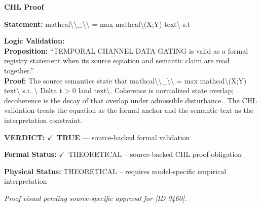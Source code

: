 \vspace{0.45em}
\noindent\textbf{CHL Proof}\par
\textbf{Statement:} mathcal\textbackslash{}\textbackslash{}\_\textbackslash{}\textbackslash{} = max mathcal\textbackslash{}(X;Y) text\textbackslash{} s.t

\textbf{Logic Validation:}\\
\textbf{Proposition:} ``TEMPORAL CHANNEL DATA GATING is valid as a formal registry statement when its source
equation and semantic claim are read together.''\\
\textbf{Proof:} The source semantics state that mathcal\textbackslash{}\textbackslash{}\_\textbackslash{}\textbackslash{} = max mathcal\textbackslash{}(X;Y) text\textbackslash{} s.t. \textbackslash{} Delta t >
0 land text\textbackslash{}. Coherence is normalized state overlap; decoherence is the decay of that
overlap under admissible disturbance.. The CHL validation treats the equation as the
formal anchor and the semantic text as the interpretation constraint.

\textbf{VERDICT:} \ensuremath{\checkmark}\ \textbf{TRUE} --- source-backed formal validation

\textbf{Formal Status:} \ensuremath{\checkmark}\ THEORETICAL -- source-backed CHL proof obligation

\textbf{Physical Status:} THEORETICAL -- requires model-specific empirical interpretation
\par\vspace{0.45em}
\par
\vfill
\begingroup\footnotesize\itshape
Proof visual pending source-specific approval for [ID 0460].
\par\endgroup
\vfill
\endgroup
\endgroup
